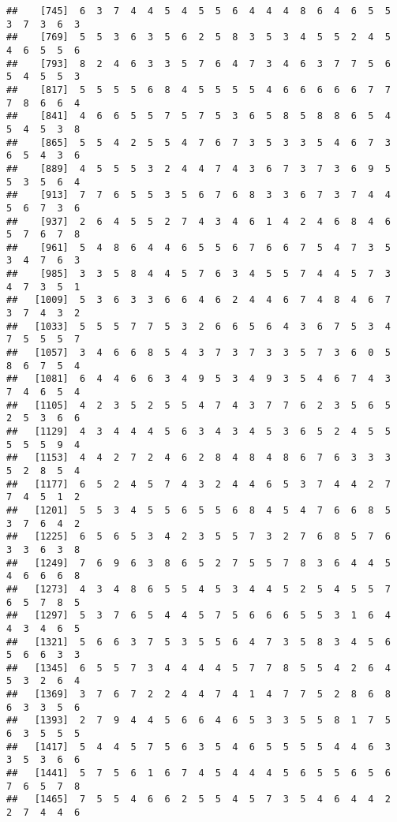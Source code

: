 \documentclass[
]{book}
\begin{document}
\begin{verbatim}
##    [745]  6  3  7  4  4  5  4  5  5  6  4  4  4  8  6  4  6  5  5  3  7  3  6  3
##    [769]  5  5  3  6  3  5  6  2  5  8  3  5  3  4  5  5  2  4  5  4  6  5  5  6
##    [793]  8  2  4  6  3  3  5  7  6  4  7  3  4  6  3  7  7  5  6  5  4  5  5  3
##    [817]  5  5  5  5  6  8  4  5  5  5  5  4  6  6  6  6  6  7  7  7  8  6  6  4
##    [841]  4  6  6  5  5  7  5  7  5  3  6  5  8  5  8  8  6  5  4  5  4  5  3  8
##    [865]  5  5  4  2  5  5  4  7  6  7  3  5  3  3  5  4  6  7  3  6  5  4  3  6
##    [889]  4  5  5  5  3  2  4  4  7  4  3  6  7  3  7  3  6  9  5  5  3  5  6  4
##    [913]  7  7  6  5  5  3  5  6  7  6  8  3  3  6  7  3  7  4  4  5  6  7  3  6
##    [937]  2  6  4  5  5  2  7  4  3  4  6  1  4  2  4  6  8  4  6  5  7  6  7  8
##    [961]  5  4  8  6  4  4  6  5  5  6  7  6  6  7  5  4  7  3  5  3  4  7  6  3
##    [985]  3  3  5  8  4  4  5  7  6  3  4  5  5  7  4  4  5  7  3  4  7  3  5  1
##   [1009]  5  3  6  3  3  6  6  4  6  2  4  4  6  7  4  8  4  6  7  3  7  4  3  2
##   [1033]  5  5  5  7  7  5  3  2  6  6  5  6  4  3  6  7  5  3  4  7  5  5  5  7
##   [1057]  3  4  6  6  8  5  4  3  7  3  7  3  3  5  7  3  6  0  5  8  6  7  5  4
##   [1081]  6  4  4  6  6  3  4  9  5  3  4  9  3  5  4  6  7  4  3  7  4  6  5  4
##   [1105]  4  2  3  5  2  5  5  4  7  4  3  7  7  6  2  3  5  6  5  2  5  3  6  6
##   [1129]  4  3  4  4  4  5  6  3  4  3  4  5  3  6  5  2  4  5  5  5  5  5  9  4
##   [1153]  4  4  2  7  2  4  6  2  8  4  8  4  8  6  7  6  3  3  3  5  2  8  5  4
##   [1177]  6  5  2  4  5  7  4  3  2  4  4  6  5  3  7  4  4  2  7  7  4  5  1  2
##   [1201]  5  5  3  4  5  5  6  5  5  6  8  4  5  4  7  6  6  8  5  3  7  6  4  2
##   [1225]  6  5  6  5  3  4  2  3  5  5  7  3  2  7  6  8  5  7  6  3  3  6  3  8
##   [1249]  7  6  9  6  3  8  6  5  2  7  5  5  7  8  3  6  4  4  5  4  6  6  6  8
##   [1273]  4  3  4  8  6  5  5  4  5  3  4  4  5  2  5  4  5  5  7  6  5  7  8  5
##   [1297]  5  3  7  6  5  4  4  5  7  5  6  6  6  5  5  3  1  6  4  4  3  4  6  5
##   [1321]  5  6  6  3  7  5  3  5  5  6  4  7  3  5  8  3  4  5  6  5  6  6  3  3
##   [1345]  6  5  5  7  3  4  4  4  4  5  7  7  8  5  5  4  2  6  4  5  3  2  6  4
##   [1369]  3  7  6  7  2  2  4  4  7  4  1  4  7  7  5  2  8  6  8  6  3  3  5  6
##   [1393]  2  7  9  4  4  5  6  6  4  6  5  3  3  5  5  8  1  7  5  6  3  5  5  5
##   [1417]  5  4  4  5  7  5  6  3  5  4  6  5  5  5  5  4  4  6  3  3  5  3  6  6
##   [1441]  5  7  5  6  1  6  7  4  5  4  4  4  5  6  5  5  6  5  6  7  6  5  7  8
##   [1465]  7  5  5  4  6  6  2  5  5  4  5  7  3  5  4  6  4  4  2  2  7  4  4  6

\end{verbatim}
\end{document}
